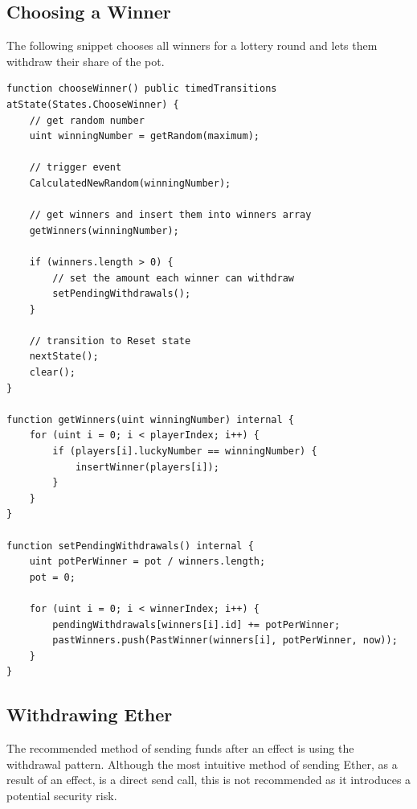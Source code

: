 \subsection{Choosing a Winner}\label{sec:winner}

The following snippet chooses all winners for a lottery round and lets them withdraw their share of the pot.

\begin{lstlisting}[language=Solidity]
function chooseWinner() public timedTransitions atState(States.ChooseWinner) {
    // get random number
    uint winningNumber = getRandom(maximum);

    // trigger event
    CalculatedNewRandom(winningNumber);

    // get winners and insert them into winners array
    getWinners(winningNumber);

    if (winners.length > 0) {
        // set the amount each winner can withdraw
        setPendingWithdrawals();
    }

    // transition to Reset state
    nextState();
    clear();
}

function getWinners(uint winningNumber) internal {
    for (uint i = 0; i < playerIndex; i++) {
        if (players[i].luckyNumber == winningNumber) {
            insertWinner(players[i]);
        }
    }
}

function setPendingWithdrawals() internal {
    uint potPerWinner = pot / winners.length;
    pot = 0;

    for (uint i = 0; i < winnerIndex; i++) {
        pendingWithdrawals[winners[i].id] += potPerWinner;
        pastWinners.push(PastWinner(winners[i], potPerWinner, now));
    }
}
\end{lstlisting}


\subsection{Withdrawing Ether}\label{sec:withdraw}

The recommended method of sending funds after an effect is using the withdrawal pattern. Although the most intuitive method of sending Ether, as a result of an effect, is a direct send call, this is not recommended as it introduces a potential security risk.

